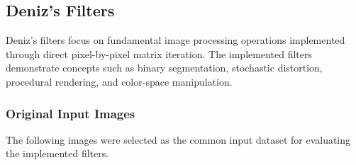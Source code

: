 \subsection{Deniz's Filters}

Deniz's filters focus on fundamental image processing operations implemented through direct pixel-by-pixel matrix iteration. The implemented filters demonstrate concepts such as binary segmentation, stochastic distortion, procedural rendering, and color-space manipulation.

\subsubsection{Original Input Images}

The following images were selected as the common input dataset for evaluating the implemented filters.

